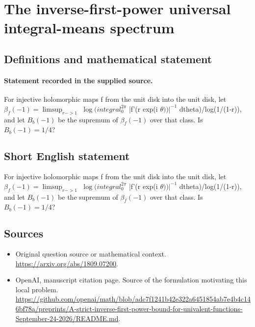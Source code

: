 \documentclass[11pt]{article}
\begin{document}
\section*{The inverse-first-power universal integral-means spectrum}\label{30007431}
\subsection{Definitions and mathematical statement}
\paragraph{Statement recorded in the supplied source.}
For injective holomorphic maps f from the unit disk into the unit disk, let $\beta _f(-1)=\limsup _{r->1}$ $\log (integral_0^{2\pi }$ |f'(r exp(i $\theta ))|^{-1}$ dtheta)/log(1/(1-r)), and let $B_b(-1)$ be the supremum of $\beta _f(-1)$ over that class. Is $B_b(-1)=1/4$?
\subsection{Short English statement}
For injective holomorphic maps f from the unit disk into the unit disk, let $\beta _f(-1)=\limsup _{r->1}$ $\log (integral_0^{2\pi }$ |f'(r exp(i $\theta ))|^{-1}$ dtheta)/log(1/(1-r)), and let $B_b(-1)$ be the supremum of $\beta _f(-1)$ over that class. Is $B_b(-1)=1/4$?
\subsection{Sources}
\begin{itemize}
\item[S1] Original question source or mathematical context.
\url{https://arxiv.org/abs/1809.07200}.
\item[S2] OpenAI, manuscript citation page. Source of the formulation motivating this local problem.
\url{https://github.com/openai/math/blob/adc7f1241b42e322a6451854ab7e4b4c146bf78a/preprints/A-strict-inverse-first-power-bound-for-univalent-functions-September-24-2026/README.md}.
\end{itemize}
\end{document}
